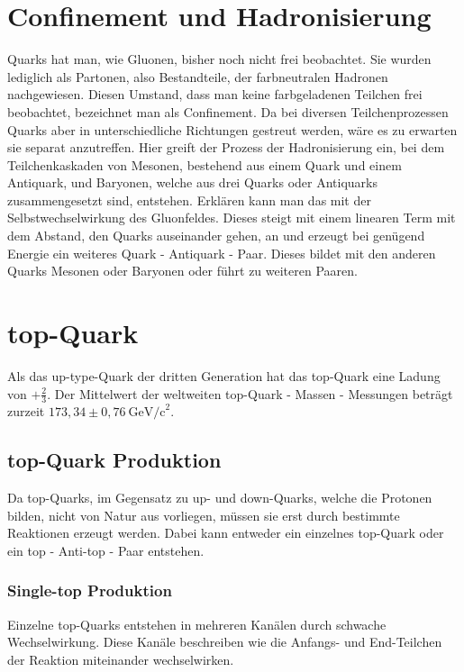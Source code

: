 \documentclass[
a4paper,                                %
twoside,                                %
BCOR1.4cm,                      %
ngerman,                                %
10pt,                           %
headings=normal,                %
headsepline,                    %
clearplainpage, %
final,                                  %
div=14,
parskip=full
]{scrbook}
\begin{document}
\section{Confinement und Hadronisierung}

Quarks hat man, wie Gluonen,  bisher noch nicht frei beobachtet. Sie wurden lediglich als Partonen, also Bestandteile, der farbneutralen Hadronen nachgewiesen.
Diesen Umstand, dass man keine farbgeladenen Teilchen frei beobachtet, bezeichnet man als Confinement.
Da bei diversen Teilchenprozessen Quarks aber in unterschiedliche Richtungen gestreut werden, w\"are es zu erwarten sie separat anzutreffen. Hier greift der Prozess der Hadronisierung ein, bei dem Teilchenkaskaden von Mesonen, bestehend aus einem Quark und einem Antiquark, und Baryonen, welche aus drei Quarks oder Antiquarks zusammengesetzt sind, entstehen. 
Erkl\"aren kann man das mit der Selbstwechselwirkung des Gluonfeldes. Dieses steigt mit einem linearen Term mit dem Abstand, den Quarks auseinander gehen, an und erzeugt bei gen\"ugend Energie ein weiteres Quark - Antiquark - Paar. Dieses bildet mit den anderen Quarks Mesonen oder Baryonen oder f\"uhrt zu weiteren Paaren. \cite{dipljbehr}

\section{top-Quark}

Als das up-type-Quark der dritten Generation hat das top-Quark eine Ladung von $ +\tfrac{2}{3} $. 
Der Mittelwert der weltweiten top-Quark - Massen - Messungen betr\"agt zurzeit 
$ 173{,}34 \pm 0{,}76\ \text{GeV}\text{/c}^{2} $. \cite{massaverage}
 
\subsection{top-Quark Produktion}

Da top-Quarks, im Gegensatz zu up- und down-Quarks, welche die Protonen bilden, nicht von Natur aus vorliegen, m\"ussen sie erst durch bestimmte Reaktionen erzeugt werden. Dabei kann entweder ein einzelnes top-Quark oder ein top - Anti-top - Paar entstehen. 

\subsubsection{Single-top Produktion}

Einzelne top-Quarks entstehen in mehreren Kan\"alen durch schwache Wechselwirkung. Diese Kan\"ale beschreiben wie die Anfangs- und End-Teilchen der Reaktion miteinander wechselwirken.
\end{document}
